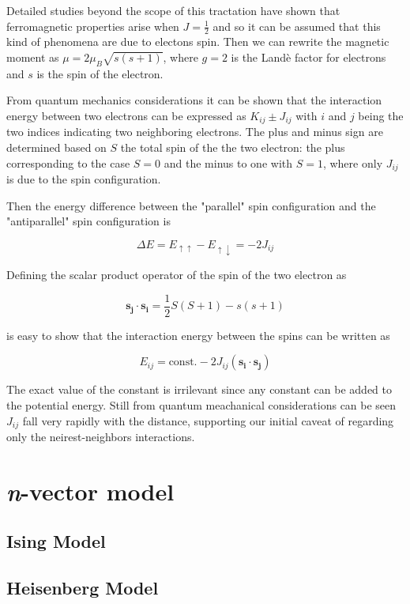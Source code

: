 Detailed studies beyond the scope of this tractation have shown that ferromagnetic
properties arise when $J=\frac{1}{2}$ and so it can be assumed that this kind of 
phenomena are due to electons spin. Then we can rewrite the magnetic moment as 
$\mu = 2 \mu_B \sqrt{s(s+1)}$, where $g=2$ is the Landè factor for electrons and
$s$ is the spin of the electron.

From quantum mechanics considerations \parencite[see][]{bransden2003physics}
it can be shown that the interaction energy between two electrons can be expressed
as $K_{ij} \pm J_{ij}$ with $i$ and $j$ being the two indices indicating two
neighboring electrons. The plus and minus sign are determined based on $S$ the 
total spin of the the two electron: the plus corresponding to the case $S=0$ and 
the minus to one with $S=1$, where only $J_{ij}$ is due to the spin configuration.

Then the energy difference between the "parallel" spin configuration and the 
"antiparallel" spin configuration is

$$\Delta E = E_{\uparrow\uparrow} - E_{\uparrow\downarrow} = -2J_{ij}$$

Defining the scalar product operator of the spin of the two electron as 

$$ \mathbf{s_j} \cdot \mathbf{s_i} = \frac{1}{2} S(S+1) - s(s+1)$$

is easy to show that the interaction energy between the spins can be written as

$$ E_{ij} = \text{const.} - 2J_{ij} (\mathbf{s_i} \cdot \mathbf{s_j})$$

The exact value of the constant is irrilevant since any constant can be added to
the potential energy. Still from quantum meachanical considerations can be seen
$J_{ij}$ fall very rapidly with the distance, supporting our initial caveat of
regarding only the neirest-neighbors interactions.


\section{\textit{n}-vector model}

\subsection{Ising Model}

\subsection{Heisenberg Model}


